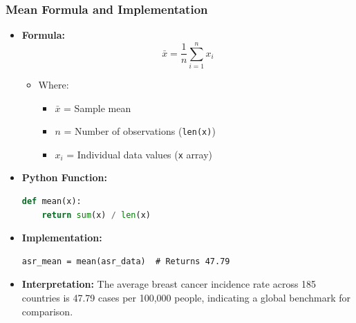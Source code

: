 \begin{frame}[fragile]
    \frametitle{Mean Formula and Implementation}
    \begin{itemize}
        \item \textbf{Formula:}
        \[
        \bar{x} = \frac{1}{n} \sum_{i=1}^{n} x_i
        \]
        \begin{itemize}
            \item Where:
            \begin{itemize}
                \item $\bar{x}$ = Sample mean
                \item $n$ = Number of observations (\texttt{len(x)})
                \item $x_i$ = Individual data values (\texttt{x} array)
            \end{itemize}
        \end{itemize}
        
        \item \textbf{Python Function:}
        \begin{lstlisting}[language=Python, breaklines=true]
def mean(x):
    return sum(x) / len(x)
        \end{lstlisting}
        
        \item \textbf{Implementation:}
        \begin{lstlisting}
asr_mean = mean(asr_data)  # Returns 47.79
        \end{lstlisting}
        
        \item \textbf{Interpretation:} The average breast cancer incidence rate across 185 countries is 47.79 cases per 100,000 people, indicating a global benchmark for comparison.
    \end{itemize}
\end{frame}

